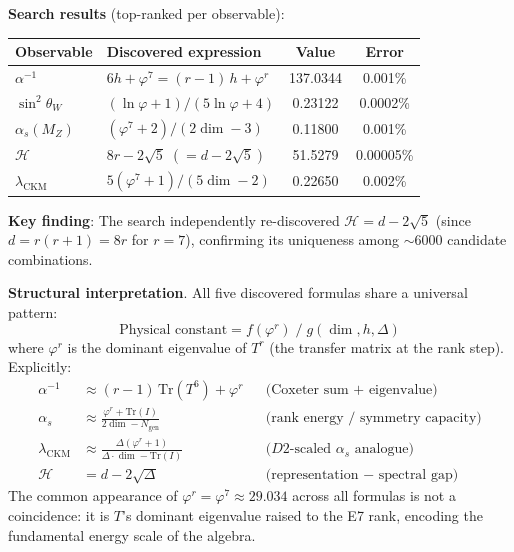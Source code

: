\documentclass[11pt,a4paper]{article}
\begin{document}
\medskip
\noindent\textbf{Search results} (top-ranked per observable):

\begin{center}
\begin{tabular}{|l|l|c|c|}
\hline
\textbf{Observable} & \textbf{Discovered expression} & \textbf{Value} & \textbf{Error} \\
\hline
$\alpha^{-1}$ & $6h + \varphi^7 = (r{-}1)\,h + \varphi^r$ & 137.0344 & 0.001\% \\
$\sin^2\theta_W$ & $(\ln\varphi + 1)/(5\ln\varphi + 4)$ & 0.23122 & 0.0002\% \\
$\alpha_s(M_Z)$ & $(\varphi^7 + 2)/(2\dim - 3)$ & 0.11800 & 0.001\% \\
$\mathcal{H}$ & $8r - 2\sqrt{5} \;(= d - 2\sqrt{5})$ & 51.5279 & 0.00005\% \\
$\lambda_{\text{CKM}}$ & $5(\varphi^7 + 1)/(5\dim - 2)$ & 0.22650 & 0.002\% \\
\hline
\end{tabular}
\end{center}

\smallskip
\noindent\textbf{Key finding}: The search independently re-discovered $\mathcal{H} = d - 2\sqrt{5}$ (since $d = r(r+1) = 8r$ for $r=7$), confirming its uniqueness among $\sim 6000$ candidate combinations.

\medskip
\noindent\textbf{Structural interpretation}. All five discovered formulas share a universal pattern:
\begin{equation}
\boxed{\text{Physical constant} = f(\varphi^r) \;\big/\; g(\dim, h, \Delta)}
\end{equation}
where $\varphi^r$ is the dominant eigenvalue of $T^r$ (the transfer matrix at the rank step). Explicitly:
\begin{align}
\alpha^{-1} &\approx (r-1)\,\mathrm{Tr}(T^6) + \varphi^r & &\text{(Coxeter sum $+$ eigenvalue)} \\
\alpha_s &\approx \frac{\varphi^r + \mathrm{Tr}(I)}{2\dim - N_{\text{gen}}} & &\text{(rank energy / symmetry capacity)} \\
\lambda_{\text{CKM}} &\approx \frac{\Delta(\varphi^r + 1)}{\Delta\cdot\dim - \mathrm{Tr}(I)} & &\text{($D2$-scaled $\alpha_s$ analogue)} \\
\mathcal{H} &= d - 2\sqrt{\Delta} & &\text{(representation $-$ spectral gap)}
\end{align}
The common appearance of $\varphi^r = \varphi^7 \approx 29.034$ across all formulas is not a coincidence: it is $T$'s dominant eigenvalue raised to the E7 rank, encoding the fundamental energy scale of the algebra.
\end{document}
